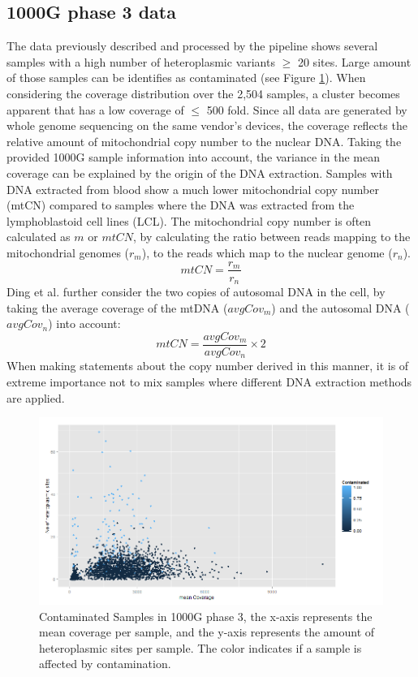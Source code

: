 \subsection{1000G phase 3 data}
The data previously described and processed by the pipeline shows several samples with a high number of heteroplasmic variants $\geq$ 20 sites. Large amount of those samples can be identifies as contaminated (see Figure \ref{cont:1000G}). When considering the coverage distribution over the 2,504 samples, a cluster becomes apparent that has a low coverage of $\leq$ 500 fold. Since all data are generated by whole genome sequencing on the same vendor's devices, the coverage reflects the relative amount of mitochondrial copy number to the nuclear DNA. Taking the provided 1000G sample information into account, the variance in the mean coverage can be explained by the origin of the DNA extraction. Samples with DNA extracted from blood show a much lower mitochondrial copy number (mtCN) compared to samples where the DNA was extracted from the lymphoblastoid cell lines (LCL). The mitochondrial copy number is often calculated as $m$ or $mtCN$, by calculating the ratio between reads mapping to the mitochondrial genomes ($r_m$), to the reads which map to the nuclear genome ($r_n$)\cite{Reznik2016}.
\begin{equation}
mtCN = \frac{r_m}{r_n}
\end{equation}
Ding et al. \cite{Ding2015} further consider the two copies of autosomal DNA in the cell, by taking the average coverage of the mtDNA ($avgCov_m$) and the autosomal DNA ($avgCov_n$) into account:
\begin{equation}
mtCN = \frac{avgCov_m}{avgCov_n}\times{2}
\end{equation}
When making statements about the copy number derived in this manner, it is of extreme importance not to mix samples where different DNA extraction methods are applied.
\begin{figure}[!ht]
    \centering
    \includegraphics[width=1\textwidth]{images/contamination1000g.png}
    \caption[Contaminated Samples in 1000G phase 3]{Contaminated Samples in 1000G phase 3, the x-axis represents the mean coverage per sample, and the y-axis represents the amount of heteroplasmic sites per sample. The color indicates if a sample is affected by contamination.} 
    \label{cont:1000G}
\end{figure}

